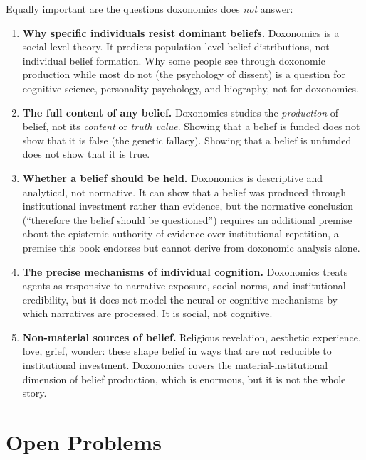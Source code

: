Equally important are the questions doxonomics does \emph{not} answer:

\begin{enumerate}
  \item \textbf{Why specific individuals resist dominant beliefs.}
  Doxonomics is a social-level theory.
  It predicts population-level belief distributions, not individual belief formation.
  Why some people see through doxonomic production while most do not (the psychology of dissent) is a question for cognitive science, personality psychology, and biography, not for doxonomics.

  \item \textbf{The full content of any belief.}
  Doxonomics studies the \emph{production} of belief, not its \emph{content} or \emph{truth value}.
  Showing that a belief is funded does not show that it is false (the genetic fallacy).
  Showing that a belief is unfunded does not show that it is true.

  \item \textbf{Whether a belief should be held.}
  Doxonomics is descriptive and analytical, not normative.
  It can show that a belief was produced through institutional investment rather than evidence, but the normative conclusion (``therefore the belief should be questioned'') requires an additional premise about the epistemic authority of evidence over institutional repetition, a premise this book endorses but cannot derive from doxonomic analysis alone.

  \item \textbf{The precise mechanisms of individual cognition.}
  Doxonomics treats agents as responsive to narrative exposure, social norms, and institutional credibility, but it does not model the neural or cognitive mechanisms by which narratives are processed.
  It is social, not cognitive.

  \item \textbf{Non-material sources of belief.}
  Religious revelation, aesthetic experience, love, grief, wonder: these shape belief in ways that are not reducible to institutional investment.
  Doxonomics covers the material-institutional dimension of belief production, which is enormous, but it is not the whole story.
\end{enumerate}

\section{Open Problems}
\label{sec:ch35-open}

